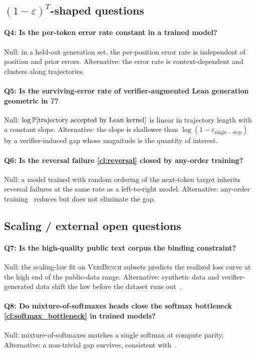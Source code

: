 \subsection{$(1-\varepsilon)^T$-shaped questions}
\label{app:eps_open}

\paragraph{Q4: Is the per-token error rate constant in a trained model?}
Null: in a held-out generation set, the per-position error rate is independent of position and prior errors.
Alternative: the error rate is context-dependent and clusters along trajectories.

\paragraph{Q5: Is the surviving-error rate of verifier-augmented Lean generation geometric in $T$?}
Null: $\log \mathbb{P}[\text{trajectory accepted by Lean kernel}]$ is linear in trajectory length with a constant slope.
Alternative: the slope is shallower than $\log(1 - \varepsilon_{\mathrm{single-step}})$ by a verifier-induced gap whose magnitude is the quantity of interest.

\paragraph{Q6: Is the reversal failure \ref{cl:reversal} closed by any-order training?}
Null: a model trained with random ordering of the next-token target inherits reversal failures at the same rate as a left-to-right model.
Alternative: any-order training~\citep{sahoo2024simple,kitouni2024factorization} reduces but does not eliminate the gap.

\subsection{Scaling / external open questions}
\label{app:scaling_open}

\paragraph{Q7: Is the high-quality public text corpus the binding constraint?}
Null: the scaling-law fit on \textsc{VeriBench} subsets predicts the realized loss curve at the high end of the public-data range.
Alternative: synthetic data and verifier-generated data shift the law before the dataset runs out~\citep{kazemi2024boostingdata}.

\paragraph{Q8: Do mixture-of-softmaxes heads close the softmax bottleneck \ref{cl:softmax_bottleneck} in trained models?}
Null: mixture-of-softmaxes matches a single softmax at compute parity.
Alternative: a non-trivial gap survives, consistent with~\citet{yang2018softmax,chang2022softmax}.
